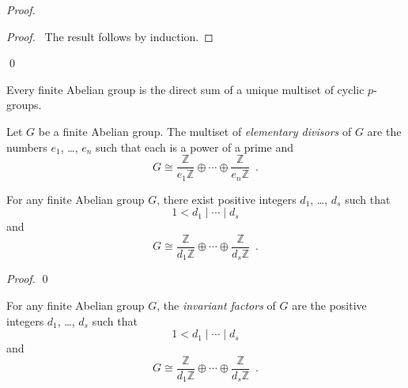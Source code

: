 \begin{proof}
\pf
{}
\qedstep
\begin{proof}
	\pf\ The result follows by induction.
\end{proof}
\qed
\end{proof}

\begin{cor}
Every finite Abelian group is the direct sum of a unique multiset of cyclic $p$-groups.
\end{cor}

\begin{df}
Let $G$ be a finite Abelian group. The multiset of \emph{elementary divisors} of $G$ are the numbers $e_1$, \ldots, $e_n$ such that each is a power of a prime and
\[ G \cong \frac{\mathbb{Z}}{e_1 \mathbb{Z}} \oplus \cdots \oplus \frac{\mathbb{Z}}{e_n \mathbb{Z}} \enspace . \]
\end{df}

\begin{prop}
For any finite Abelian group $G$, there exist positive integers $d_1$, \ldots, $d_s$ such that
\[ 1 < d_1 \mid \cdots \mid d_s \]
and
\[ G \cong \frac{\mathbb{Z}}{d_1 \mathbb{Z}} \oplus \cdots \oplus \frac{\mathbb{Z}}{d_s \mathbb{Z}} \enspace . \]
\end{prop}

\begin{proof}
\pf
{}
\qed
\end{proof}

\begin{df}
For any finite Abelian group $G$, the \emph{invariant factors} of $G$ are the positive integers $d_1$, \ldots, $d_s$ such that
\[ 1 < d_1 \mid \cdots \mid d_s \]
and
\[ G \cong \frac{\mathbb{Z}}{d_1 \mathbb{Z}} \oplus \cdots \oplus \frac{\mathbb{Z}}{d_s \mathbb{Z}} \enspace . \]
\end{df}

